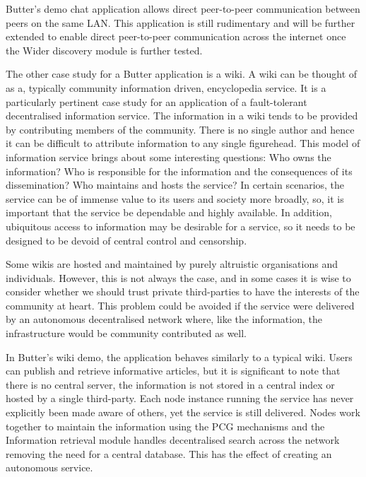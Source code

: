 Butter's demo chat application allows direct peer-to-peer communication between peers on the same LAN. This application is still rudimentary and will be further extended to enable direct peer-to-peer communication across the internet once the Wider discovery module is further tested.

The other case study for a Butter application is a wiki. A wiki can be thought of as a, typically community information driven, encyclopedia service. It is a particularly pertinent case study for an application of a fault-tolerant decentralised information service. The information in a wiki tends to be provided by contributing members of the community. There is no single author and hence it can be difficult to attribute information to any single figurehead. This model of information service brings about some interesting questions: Who owns the information? Who is responsible for the information and the consequences of its dissemination? Who maintains and hosts the service? In certain scenarios, the service can be of immense value to its users and society more broadly, so, it is important that the service be dependable and highly available. In addition, ubiquitous access to information may be desirable for a service, so it needs to be designed to be devoid of central control and censorship.

Some wikis are hosted and maintained by purely altruistic organisations and individuals. However, this is not always the case, and in some cases it is wise to consider whether we should trust private third-parties to have the interests of the community at heart. This problem could be avoided if the service were delivered by an autonomous decentralised network where, like the information, the infrastructure would be community contributed as well.

In Butter's wiki demo, the application behaves similarly to a typical wiki. Users can publish and retrieve informative articles, but it is significant to note that there is no central server, the information is not stored in a central index or hosted by a single third-party. Each node instance running the service has never explicitly been made aware of others, yet the service is still delivered. Nodes work together to maintain the information using the PCG mechanisms and the Information retrieval module handles decentralised search across the network removing the need for a central database. This has the effect of creating an autonomous service.

